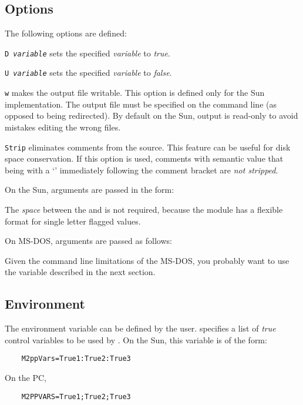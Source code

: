 \subsection{Options}
The following options are defined:
\begin{description}
    \item{\tt D {\em variable}}
	sets the specified {\em variable} to {\em true}.
    \item{\tt U {\em variable}}
	sets the specified {\em variable} to {\em false}.
    \item{\tt w}
	makes the output file writable.  This option is defined only
	for the Sun implementation.  The output file must be specified
	on the command line (as opposed to being redirected).  By default
	on the Sun, output is read-only to avoid mistakes editing the
	wrong files.
    \item{\tt Strip}
	eliminates comments from the source.  This feature can be useful
	for disk space conservation.   If this option is used, comments
	with semantic value that being with a `\code{\$}' immediately
	following the comment bracket are {\em not stripped}.
\end{description}

On the Sun, arguments are passed in the form:
\begin{quote}
\end{quote}
The {\em space} between the  and  is not required,
because the module  has a flexible format for single
letter flagged values.

On MS-DOS, arguments are passed as follows:
\begin{quote}
\end{quote}
Given the command line limitations of the MS-DOS, you probably want
to use the  variable described in the next section.

\subsection{Environment}
The environment variable  can be defined by the user.
 specifies a list of {\em true} control variables to
be used by .  On the Sun, this variable is of the form:
\begin{verbatim}
    M2ppVars=True1:True2:True3
\end{verbatim}
On the PC,
\begin{verbatim}
    M2PPVARS=True1;True2;True3
\end{verbatim}

